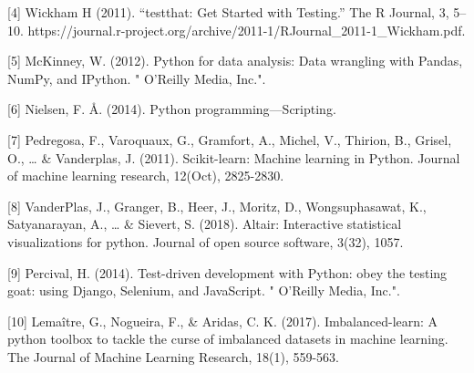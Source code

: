 \documentclass[11pt]{article}
\begin{document}
{[}4{]} Wickham H (2011). ``testthat: Get Started with Testing.'' The R
Journal, 3, 5--10.
https://journal.r-project.org/archive/2011-1/RJournal\_2011-1\_Wickham.pdf.

{[}5{]} McKinney, W. (2012). Python for data analysis: Data wrangling
with Pandas, NumPy, and IPython. " O'Reilly Media, Inc.".

{[}6{]} Nielsen, F. Å. (2014). Python programming---Scripting.

{[}7{]} Pedregosa, F., Varoquaux, G., Gramfort, A., Michel, V., Thirion,
B., Grisel, O., \ldots{} \& Vanderplas, J. (2011). Scikit-learn: Machine
learning in Python. Journal of machine learning research, 12(Oct),
2825-2830.

{[}8{]} VanderPlas, J., Granger, B., Heer, J., Moritz, D.,
Wongsuphasawat, K., Satyanarayan, A., \ldots{} \& Sievert, S. (2018).
Altair: Interactive statistical visualizations for python. Journal of
open source software, 3(32), 1057.

{[}9{]} Percival, H. (2014). Test-driven development with Python: obey
the testing goat: using Django, Selenium, and JavaScript. " O'Reilly
Media, Inc.".

{[}10{]} Lemaître, G., Nogueira, F., \& Aridas, C. K. (2017).
Imbalanced-learn: A python toolbox to tackle the curse of imbalanced
datasets in machine learning. The Journal of Machine Learning Research,
18(1), 559-563.

    \cite{Python} \cite{Dua:2019}


    
    



    
    
\end{document}
